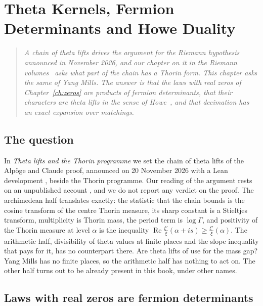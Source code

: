 \chapter{Theta Kernels, Fermion Determinants and Howe Duality}\label{ch:theta}

\begin{quote}
\emph{A chain of theta lifts drives the argument for the Riemann hypothesis announced in November 2026, and our chapter on it in the Riemann volumes~\cite{PS26t} asks what part of the chain has a Thorin form. This chapter asks the same of Yang Mills. The answer is that the laws with real zeros of Chapter~\ref{ch:zeros} are products of fermion determinants, that their characters are theta lifts in the sense of Howe~\cite{Ho89}, and that decimation has an exact expansion over matchings.}
\end{quote}

\section{The question}

In \emph{Theta lifts and the Thorin programme} \cite{PS26t} we set the chain of theta lifts of the Alp\"oge and Claude proof, announced on 20 November 2026 with a Lean development \cite{Alp26}, beside the Thorin programme. Our reading of the argument rests on an unpublished account \cite{DLCL}, and we do not report any verdict on the proof. The archimedean half translates exactly: the statistic that the chain bounds is the cosine transform of the centre Thorin measure, its sharp constant is a Stieltjes transform, multiplicity is Thorin mass, the period term is $\log\Gamma$, and positivity of the Thorin measure at level $\alpha$ is the inequality $\operatorname{Re}\frac{\xi'}{\xi}(\alpha+is)\ge\frac{\xi'}{\xi}(\alpha)$. The arithmetic half, divisibility of theta values at finite places and the slope inequality that pays for it, has no counterpart there. Are theta lifts of use for the mass gap? Yang Mills has no finite places, so the arithmetic half has nothing to act on. The other half turns out to be already present in this book, under other names.

\section{Laws with real zeros are fermion determinants}\label{sec:t11det}


